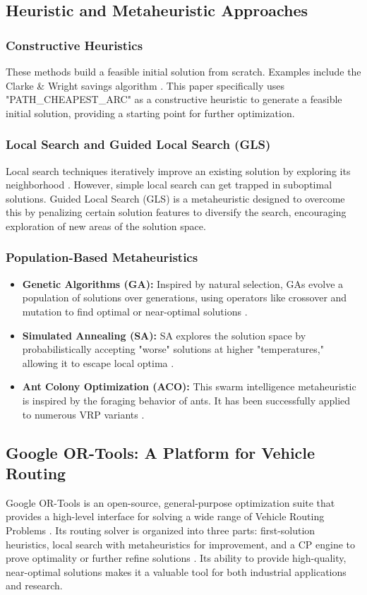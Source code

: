 \documentclass[conference]{IEEEtran} %
\begin{document}
\subsection{Heuristic and Metaheuristic Approaches}
\subsubsection{Constructive Heuristics}
These methods build a feasible initial solution from scratch. Examples include the Clarke \& Wright savings algorithm \cite{cordeau1997tabu}. This paper specifically uses "PATH\_CHEAPEST\_ARC" as a constructive heuristic to generate a feasible initial solution, providing a starting point for further optimization.

\subsubsection{Local Search and Guided Local Search (GLS)}
Local search techniques iteratively improve an existing solution by exploring its neighborhood \cite{pisinger2007general}. However, simple local search can get trapped in suboptimal solutions. Guided Local Search (GLS) is a metaheuristic designed to overcome this by penalizing certain solution features to diversify the search, encouraging exploration of new areas of the solution space.

\subsubsection{Population-Based Metaheuristics}
\begin{itemize}
    \item \textbf{Genetic Algorithms (GA):} Inspired by natural selection, GAs evolve a population of solutions over generations, using operators like crossover and mutation to find optimal or near-optimal solutions \cite{potvin1995genetic}.
    \item \textbf{Simulated Annealing (SA):} SA explores the solution space by probabilistically accepting "worse" solutions at higher "temperatures," allowing it to escape local optima \cite{lin2007efficient}.
    \item \textbf{Ant Colony Optimization (ACO):} This swarm intelligence metaheuristic is inspired by the foraging behavior of ants. It has been successfully applied to numerous VRP variants \cite{dorigo2004ant}.
\end{itemize}

\subsection{Google OR-Tools: A Platform for Vehicle Routing}
Google OR-Tools is an open-source, general-purpose optimization suite that provides a high-level interface for solving a wide range of Vehicle Routing Problems \cite{google_or_tools}. Its routing solver is organized into three parts: first-solution heuristics, local search with metaheuristics for improvement, and a CP engine to prove optimality or further refine solutions \cite{pelsmaeker2019or}. Its ability to provide high-quality, near-optimal solutions makes it a valuable tool for both industrial applications and research.
\end{document}
